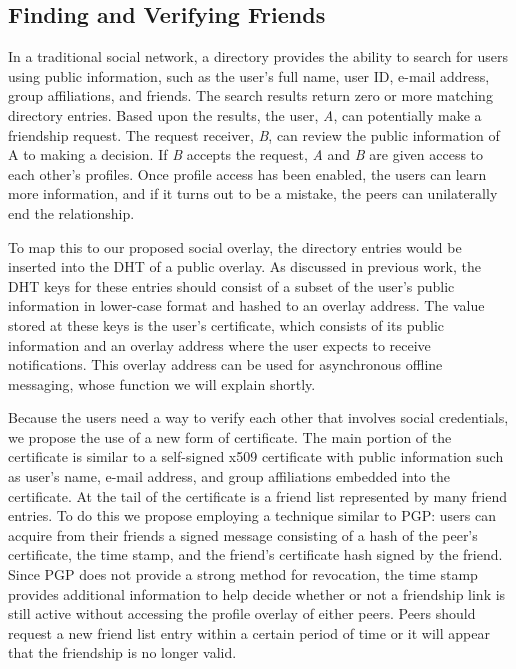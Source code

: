 \documentclass[conference]{IEEEtran}
\begin{document}
\subsection{Finding and Verifying Friends}
In a traditional social network, a directory provides the ability to search
for users using public information, such as the user's full name, user ID,
e-mail address, group affiliations, and friends.  The search results return zero
or more matching directory entries.  Based upon the results, the user,
\textit{A}, can potentially make a friendship request.  The request receiver,
\textit{B}, can review the public information of A to making a decision.  If
\textit{B} accepts the request, \textit{A} and \textit{B} are given access to
each other's profiles.  Once profile access has been enabled, the users can
learn more information, and if it turns out to be a mistake, the peers can
unilaterally end the relationship.

To map this to our proposed social overlay, the directory entries would be
inserted into the DHT of a public overlay.  As discussed in previous work, the
DHT keys for these entries should consist of a subset of the user's
public information in lower-case format and hashed to an overlay  address.  The
value stored at these keys is the user's certificate, which consists of its public
information and an overlay address where the user expects to receive
notifications.  This overlay address can be used for asynchronous offline
messaging, whose function we will explain shortly.

Because the users need a way to verify each other that involves social credentials,
we propose the use of a new form of certificate.
The main portion of the certificate is similar to a self-signed
x509 certificate with public information such as user's name, e-mail
address, and group affiliations embedded into the certificate.  At the tail of
the certificate is a friend list represented by many friend entries.  To do this
we propose employing a technique similar to PGP: users can acquire from their
friends a signed message consisting of a hash of the peer's certificate, the
time stamp, and the friend's certificate hash signed by the friend.  Since PGP
does not provide a strong method for revocation, the time stamp provides
additional information to help decide whether or not a friendship link is still
active without accessing the profile overlay of either peers.  Peers should
request a new friend list entry within a certain period of time or it will
appear that the friendship is no longer valid.
\end{document}
